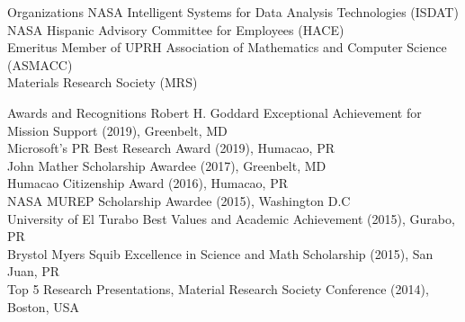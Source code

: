 \documentclass{resume} %
\begin{document}
\begin{rSection}{Organizations}
NASA Intelligent Systems for Data Analysis Technologies (ISDAT) \\
NASA Hispanic Advisory Committee for Employees (HACE) \\
Emeritus Member of UPRH Association of Mathematics and Computer Science (ASMACC) \\
Materials Research Society (MRS) \\
\end{rSection}


\begin{rSection}{Awards and Recognitions}
Robert H. Goddard Exceptional Achievement for Mission Support (2019), Greenbelt, MD \\
Microsoft's PR Best Research Award (2019), Humacao, PR \\
John Mather Scholarship Awardee (2017), Greenbelt, MD \\
Humacao Citizenship Award (2016), Humacao, PR \\
NASA MUREP Scholarship Awardee (2015), Washington D.C \\
University of El Turabo Best Values and Academic Achievement (2015), Gurabo, PR \\
Brystol Myers Squib Excellence in Science and Math Scholarship (2015), San Juan, PR \\
Top 5 Research Presentations, Material Research Society Conference (2014), Boston, USA \\
\end{rSection}




\end{document}
